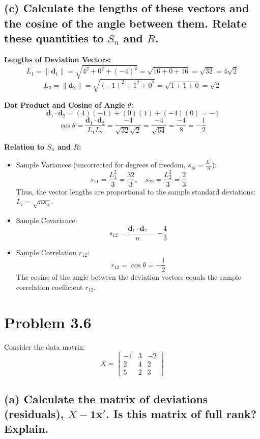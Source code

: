 \documentclass[11pt,a4paper]{article}
\begin{document}
\subsection*{(c) Calculate the lengths of these vectors and the cosine of the angle between them. Relate these quantities to $S_n$ and $R$.}

\textbf{Lengths of Deviation Vectors:}
\[
L_1 = \|\mathbf{d}_1\| = \sqrt{4^2 + 0^2 + (-4)^2} = \sqrt{16 + 0 + 16} = \sqrt{32} = 4\sqrt{2}
\]
\[
L_2 = \|\mathbf{d}_2\| = \sqrt{(-1)^2 + 1^2 + 0^2} = \sqrt{1 + 1 + 0} = \sqrt{2}
\]

\textbf{Dot Product and Cosine of Angle $\theta$:}
\[
\mathbf{d}_1 \cdot \mathbf{d}_2 = (4)(-1) + (0)(1) + (-4)(0) = -4
\]
\[
\cos \theta = \frac{\mathbf{d}_1 \cdot \mathbf{d}_2}{L_1 L_2} = \frac{-4}{\sqrt{32}\sqrt{2}} = \frac{-4}{\sqrt{64}} = \frac{-4}{8} = -\frac{1}{2}
\]

\textbf{Relation to $S_n$ and $R$:}
\begin{itemize}
    \item Sample Variances (uncorrected for degrees of freedom, $s_{ik} = \frac{L_i^2}{n}$):
    \[
    s_{11} = \frac{L_1^2}{3} = \frac{32}{3}, \quad s_{22} = \frac{L_2^2}{3} = \frac{2}{3}
    \]
    Thus, the vector lengths are proportional to the sample standard deviations: $L_i = \sqrt{n s_{ii}}$.
    \item Sample Covariance:
    \[
    s_{12} = \frac{\mathbf{d}_1 \cdot \mathbf{d}_2}{n} = -\frac{4}{3}
    \]
    \item Sample Correlation $r_{12}$:
    \[
    r_{12} = \cos \theta = -\frac{1}{2}
    \]
    The cosine of the angle between the deviation vectors equals the sample correlation coefficient $r_{12}$.
\end{itemize}

\hr

\section*{Problem 3.6}

Consider the data matrix:
\[
X = \begin{bmatrix} -1 & 3 & -2 \\ 2 & 4 & 2 \\ 5 & 2 & 3 \end{bmatrix}
\]

\subsection*{(a) Calculate the matrix of deviations (residuals), $X - \mathbf{1}\overline{\mathbf{x}}'$. Is this matrix of full rank? Explain.}
\end{document}
